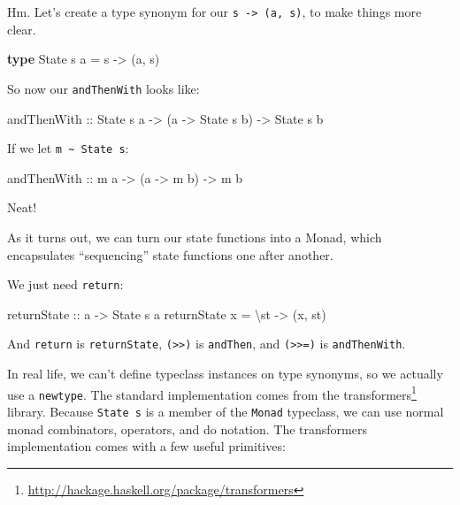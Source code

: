 \documentclass[]{article}
\newenvironment{Shaded}{}{}
\newcommand{\KeywordTok}[1]{\textcolor[rgb]{0.00,0.44,0.13}{\textbf{{#1}}}}
\newcommand{\DataTypeTok}[1]{\textcolor[rgb]{0.56,0.13,0.00}{{#1}}}
\newcommand{\OtherTok}[1]{\textcolor[rgb]{0.00,0.44,0.13}{{#1}}}
\newcommand{\FunctionTok}[1]{\textcolor[rgb]{0.02,0.16,0.49}{{#1}}}
\newcommand{\NormalTok}[1]{{#1}}
\renewcommand{\href}[2]{#2\footnote{\url{#1}}}
\begin{document}
Hm. Let's create a type synonym for our \texttt{s\ -\textgreater{}\ (a,\ s)}, to
make things more clear.

\begin{Shaded}
\begin{Highlighting}[]
\KeywordTok{type} \DataTypeTok{State} \NormalTok{s a }\FunctionTok{=} \NormalTok{s }\OtherTok{->} \NormalTok{(a, s)}
\end{Highlighting}
\end{Shaded}

So now our \texttt{andThenWith} looks like:

\begin{Shaded}
\begin{Highlighting}[]
\OtherTok{andThenWith ::} \DataTypeTok{State} \NormalTok{s a }\OtherTok{->} \NormalTok{(a }\OtherTok{->} \DataTypeTok{State} \NormalTok{s b) }\OtherTok{->} \DataTypeTok{State} \NormalTok{s b}
\end{Highlighting}
\end{Shaded}

If we let \texttt{m\ \textasciitilde{}\ State\ s}:

\begin{Shaded}
\begin{Highlighting}[]
\OtherTok{andThenWith ::} \NormalTok{m a }\OtherTok{->} \NormalTok{(a }\OtherTok{->} \NormalTok{m b) }\OtherTok{->} \NormalTok{m b}
\end{Highlighting}
\end{Shaded}

Neat!

As it turns out, we can turn our state functions into a Monad, which
encapsulates ``sequencing'' state functions one after another.

We just need \texttt{return}:

\begin{Shaded}
\begin{Highlighting}[]
\OtherTok{returnState ::} \NormalTok{a }\OtherTok{->} \DataTypeTok{State} \NormalTok{s a}
\NormalTok{returnState x }\FunctionTok{=} \NormalTok{\textbackslash{}st }\OtherTok{->} \NormalTok{(x, st)}
\end{Highlighting}
\end{Shaded}

And \texttt{return} is \texttt{returnState},
\texttt{(\textgreater{}\textgreater{})} is \texttt{andThen}, and
\texttt{(\textgreater{}\textgreater{}=)} is \texttt{andThenWith}.

In real life, we can't define typeclass instances on type synonyms, so we
actually use a \texttt{newtype}. The standard implementation comes from the
\href{http://hackage.haskell.org/package/transformers}{transformers} library.
Because \texttt{State\ s} is a member of the \texttt{Monad} typeclass, we can
use normal monad combinators, operators, and do notation. The transformers
implementation comes with a few useful primitives:
\end{document}
